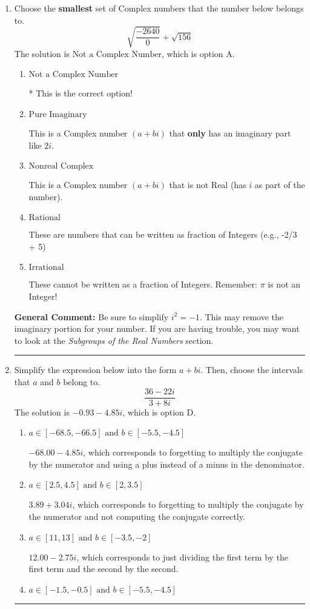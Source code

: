 \documentclass{extbook}[14pt]
\newcommand{\litem}[1]{\item #1

\rule{\textwidth}{0.4pt}}
\begin{document}
\begin{enumerate}\litem{
Choose the \textbf{smallest} set of Complex numbers that the number below belongs to.
\[ \sqrt{\frac{-2640}{0}}+\sqrt{156} \]The solution is \( \text{Not a Complex Number} \), which is option A.\begin{enumerate}[label=\Alph*.]
\item \( \text{Not a Complex Number} \)

* This is the correct option!
\item \( \text{Pure Imaginary} \)

This is a Complex number $(a+bi)$ that \textbf{only} has an imaginary part like $2i$.
\item \( \text{Nonreal Complex} \)

This is a Complex number $(a+bi)$ that is not Real (has $i$ as part of the number).
\item \( \text{Rational} \)

These are numbers that can be written as fraction of Integers (e.g., -2/3 + 5)
\item \( \text{Irrational} \)

These cannot be written as a fraction of Integers. Remember: $\pi$ is not an Integer!
\end{enumerate}

\textbf{General Comment:} Be sure to simplify $i^2 = -1$. This may remove the imaginary portion for your number. If you are having trouble, you may want to look at the \textit{Subgroups of the Real Numbers} section.
}
\litem{
Simplify the expression below into the form $a+bi$. Then, choose the intervals that $a$ and $b$ belong to.
\[ \frac{36 - 22 i}{3 + 8 i} \]The solution is \( -0.93  - 4.85 i \), which is option D.\begin{enumerate}[label=\Alph*.]
\item \( a \in [-68.5, -66.5] \text{ and } b \in [-5.5, -4.5] \)

 $-68.00  - 4.85 i$, which corresponds to forgetting to multiply the conjugate by the numerator and using a plus instead of a minus in the denominator.
\item \( a \in [2.5, 4.5] \text{ and } b \in [2, 3.5] \)

 $3.89  + 3.04 i$, which corresponds to forgetting to multiply the conjugate by the numerator and not computing the conjugate correctly.
\item \( a \in [11, 13] \text{ and } b \in [-3.5, -2] \)

 $12.00  - 2.75 i$, which corresponds to just dividing the first term by the first term and the second by the second.
\item \( a \in [-1.5, -0.5] \text{ and } b \in [-5.5, -4.5] \)


\end{enumerate}}
\end{enumerate}
\end{document}
